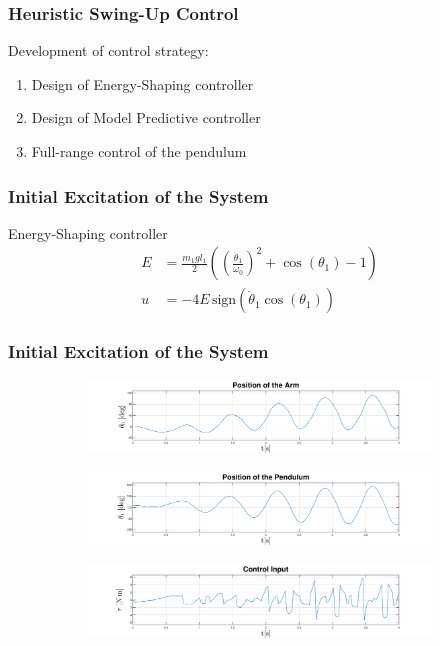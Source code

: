 \documentclass[]{beamer}
\newcommand{\lrp}[1]{\ensuremath{\left( #1 \right)}}
\begin{document}
\begin{frame}	
	\frametitle{Heuristic Swing-Up Control}	
	Development of control strategy:
	\begin{enumerate}
		\item Design of Energy-Shaping controller\\
		\item Design of Model Predictive controller\\
		\item Full-range control of the pendulum
	\end{enumerate}
\end{frame}	
 
\begin{frame}
	\frametitle{Initial Excitation of the System}
	Energy-Shaping controller
	\begin{subequations}\begin{align*}
			E &= \frac{m_1gl_1}{2}\lrp{\lrp{\frac{\dot{\theta}_1}{\omega_0}}^2+\cos(\theta_1) - 1}\\
			u &= -4E\,\text{sign}\lrp{\dot{\theta}_1\cos(\theta_1)}
		\end{align*}
	\end{subequations}
\end{frame}
\begin{frame}
	\frametitle{Initial Excitation of the System}
	\begin{figure}[H]
		\centering
		\begin{subfigure}
			\centering
			\includegraphics[scale=0.25]{images/swings/arm.pdf}  
		\end{subfigure}
		\begin{subfigure}
			\centering
			\includegraphics[scale=0.25]{images/swings/pend.pdf}  
		\end{subfigure}
		\begin{subfigure}
			\centering
			\includegraphics[scale=0.25]{images/swings/control.pdf} 
		\end{subfigure}
	\end{figure}
\end{frame}
\end{document}
